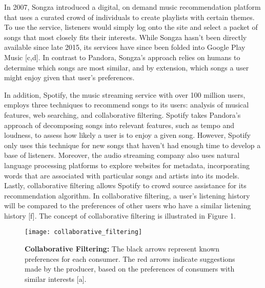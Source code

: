 \documentclass{amsart}
\theoremstyle{plain}
\theoremstyle{definition}
\begin{document}
   	In 2007, Songza introduced a digital, on demand music recommendation platform that uses a curated crowd of individuals to create playlists with certain themes. To use the service, listeners would simply log onto the site and select a packet of songs that most closely fits their interests. While Songza hasn't been directly available since late 2015, its services have since been folded into Google Play Music [c,d]. In contrast to Pandora, Songza's approach relies on humans to determine which songs are most similar, and by extension, which songs a user might enjoy given that user's preferences. 
   	
   	In addition, Spotify, the music streaming service with over 100 million users, employs three techniques to recommend songs to its users: analysis of musical features, web searching, and collaborative filtering. Spotify takes Pandora's approach of decomposing songs into relevant features, such as tempo and loudness, to assess how likely a user is to enjoy a given song. However, Spotify only uses this technique for new songs that haven't had enough time to develop a base of listeners. Moreover, the audio streaming company also uses natural language processing platforms to explore websites for metadata, incorporating words that are associated with particular songs and artists into its models. Lastly, collaborative filtering allows Spotify to crowd source assistance for its recommendation algorithm. In collaborative filtering, a user's listening history will be compared to the preferences of other users who have a similar listening history [f]. The concept of collaborative filtering is illustrated in Figure 1.
   	
   	\begin{figure}[h]
   		\centering
   		\texttt{[image: collaborative\_filtering]}
   		\caption{\textbf{Collaborative Filtering: }The black arrows represent known preferences for each consumer. The red arrows indicate suggestions made by the producer, based on the preferences of consumers with similar interests [a].}
   		\label{fig:collaborative_filtering}
   	\end{figure}
   	
\end{document}
